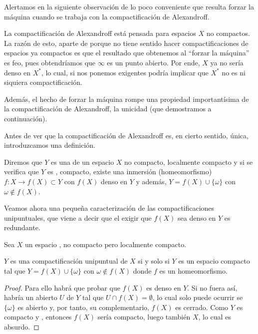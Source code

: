 Alertamos en la siguiente observación de lo poco conveniente que resulta forzar la máquina cuando se trabaja con la compactificación de Alexandroff.
\begin{obs}
	La compactificación de Alexandroff está pensada para espacios $X$ no compactos. La razón de esto, aparte de porque no tiene sentido hacer compactificaciones de espacios ya compactos es que el resultado que obtenemos al ``forzar la máquina'' es feo, pues obtendríamos que $\infty$ es un punto abierto. Por ende, $X$ ya no sería denso en $X^*$, lo cual, si nos ponemos exigentes podría implicar que $X^*$ no es ni siquiera compactificación.
	
	Además, el hecho de forzar la máquina rompe una propiedad importantísima de la compactificación de Alexandroff, la unicidad (que demostramos a continuación).
\end{obs}

Antes de ver que la compactificación de Alexandroff es, en cierto sentido, única, introduzcamos una definición.
\begin{defi}
	Diremos que $Y$ es una  de un espacio $X$ no compacto, localmente compacto y \hausdorff si se verifica que $Y$ es \hausdorff, compacto, existe una inmersión (homeomorfismo) $f:X\to f(X)\subset Y$ con $f(X)$ denso en $Y$ y además, $Y=f(X)\cup \{\omega\}$ con $\omega\not\in f(X)$.
\end{defi}

Veamos ahora una pequeña caracterización de las  compactificaciones unipuntuales, que viene a decir que el exigir que $f(X)$ sea denso en $Y$ es redundante.

\begin{lem}[Caracterización]
	Sea $X$ un espacio \hausdorff, no compacto pero localmente compacto.
	
	$Y$ es una compactificación unipuntual de $X$ si y solo si $Y$ es un espacio \hausdorff compacto tal que $Y=f(X)\cup\{\omega\}$ con $\omega\not\in f(X)$ donde $f$ es un homeomorfismo.
\end{lem}
\begin{proof}
	Para ello habrá que probar que $f(X)$ es denso en $Y$. Si no fuera así, habría un abierto $U$ de $Y$ tal que $U\cap f(X)=\emptyset$, lo cual solo puede ocurrir se $\{\omega\}$ es abierto y, por tanto, su complementario, $f(X)$ es cerrado. Como $Y$ es compacto y \hausdorff, entonces $f(X)$ sería compacto, luego también $X$, lo cual es absurdo.
\end{proof}

